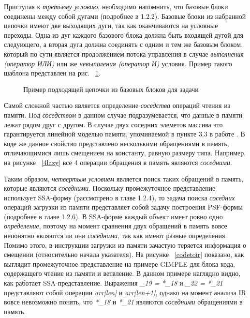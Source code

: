 Приступая к \textit{третьему условию}, необходимо напомнить, что базовые блоки соединены между собой дугами (подробнее в 1.2.2). Базовые блоки из набранной цепочки имеют две выходящих дуги, так как оканчиваются на условные переходы. Одна из дуг каждого базового блока должна быть входящей дугой для следующего, а вторая дуга должна соединять с одним и тем же базовым блоком, который по сути является продолжением потока управления в случае \textit{выполнения (оператор ИЛИ)} или же \textit{невыполения (оператор И)} условия. Пример такого шаблона представлен на рис. ~\ref{bbchain}.

\begin{figure}[!htb]
    \centering
    
    \caption{Пример подходящей цепочки из базовых блоков для задачи}
    \label{bbchain}
\end{figure}



Самой сложной частью является определение \textit{соседства} операций чтения из памяти. Под \textit{соседством} в данном случае подразумевается, что данные в памяти лежат рядом друг с другом. В случае двух соседних элеметов массива это гарантируется линейной моделью памяти, упоминаемой в пункте 3.3 в работе \cite{pohl2018control}. В коде же данное свойство представлено несколькими обращениями в память, отличающимися лишь смещением на константу, равную размеру типа. Например, на рисунке ~\ref{4lazy} все 4 операции обращения в память являются \textit{соседними}. 

Таким образом, \textit{четвертым условием} является поиск таких обращений в память, которые являются \textit{соседними}. Поскольку промежуточное представление использует SSA-форму (рассмотрено в главе 1.2.4), то задача поиска \textit{соседних} операций загрузки из памяти представляет собой задачу построения PSF-формы (подробнее в главе 1.2.6). В SSA-форме каждый объект имеет ровно одно \textit{определение}, поэтому на момент сравнения двух обращений в память вовсе непонятно являются ли они \textit{соседними}, так как имеют разные определения. Помимо этого, в инструкции загрузки из памяти зачастую теряется информация о смещении (относительно начала указателя). На рисунке ~\ref{codetoir} показано, как выглядит промежуточное представление на примере GIMPLE для блока кода, содержащего чтение из памяти и ветвление. В данном примере наглядно видно, как работает SSA-представление. Выражения \textit{\_19 = *\_18} и \textit{\_22 = *\_21} представляют собой операции \textit{arr[len]} и \textit{arr[len+1]}, однако на момент анализа IR вовсе невозможно понять, что \textit{*\_18} и \textit{*\_21} являются \textit{соседними} обращениями в память.


